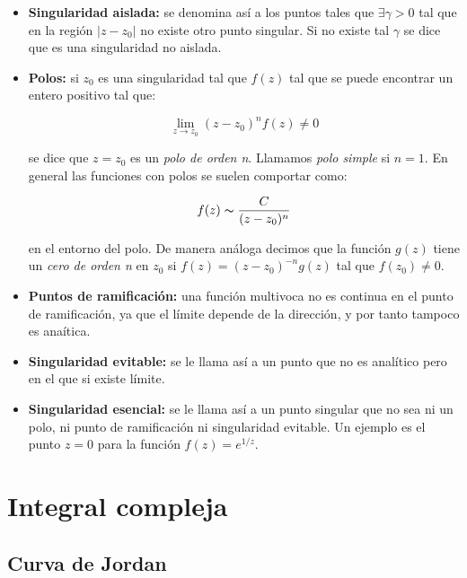 \documentclass[12pt,a4paper]{book}
\begin{document}
\begin{itemize}
\item \textbf{Singularidad aislada:} se denomina así a los puntos tales que $\exists \gamma >0 $ tal que en la región $|z-z_0|$ no existe otro punto singular. Si no existe tal $\gamma$ se dice que es una singularidad no aislada.

\item \textbf{Polos:} si $z_0$ es una singularidad tal que $f(z)$ tal que se puede encontrar un entero positivo tal que:

\begin{equation}
\lim_{z \rightarrow z_0} (z-z_0)^n f(z) \neq 0
\end{equation}

se dice que $z=z_0$ es un \textit{polo de orden n}. Llamamos \textit{polo simple} si $n=1$. En general las funciones con polos se suelen comportar como:

\begin{equation}
f(z) \thicksim \frac{C}{(z-z_0)^n}
\end{equation}


en el entorno del polo. De manera análoga decimos que la función $g(z)$ tiene un \textit{cero de orden n} en $z_0$ si $f(z)=(z-z_0)^{-n} g(z)$ tal que $f(z_0) \neq  0$. 

\item \textbf{Puntos de ramificación:} una función multivoca no es continua en el punto de ramificación, ya que el límite depende de la dirección, y por tanto tampoco es anaítica.

\item \textbf{Singularidad evitable:} se le llama así a un punto que no es analítico pero en el que si existe límite.

\item \textbf{Singularidad esencial:} se le llama  así a un punto singular que no sea ni un polo, ni punto de ramificación ni singularidad evitable. Un ejemplo es el punto $z=0$ para la función $f(z)=e^{1/z}$.
\end{itemize}

\chapter{Integral compleja}

\section{Curva de Jordan}
\end{document}
